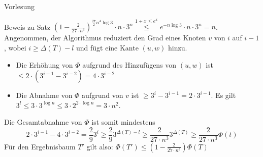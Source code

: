 \begin{section}{Vorlesung}
\begin{subsection}{Beweis zu Satz}
  $(1-\frac{2}{27 \cdot n^3})^{\frac{27}{2} n^4 \log 3} \cdot n \cdot 3^n \overset{1+x \leq e^x}{\leq} e^{-n\log 3}\cdot n \cdot 3^n = n$. \\
  Angenommen, der Algorithmus reduziert den Grad eines Knoten $v$ von $i$ auf $i-1$, wobei $i \geq \Delta(T)-l$ und fügt eine Kante $(u,w)$ hinzu.
  \begin{itemize}
   \item Die Erhöhung von $\Phi$ aufgrund des Hinzufügens von $(u,w)$ ist $\leq 2\cdot (3^{i-1}-3^{i-2}) = 4\cdot 3^{i-2}$
   \item Die Abnahme von $\Phi$ aufgrund von $v$ ist $\geq 3^i - 3^{i-1} = 2 \cdot 3^{i-1}$. Es gilt $3^l \leq 3 \cdot 3^{\log n} \leq 3 \cdot 2^{2\cdot \log n} = 3\cdot n^2$.
  \end{itemize}
  Die Gesamtabnahme von $\Phi$ ist somit mindestens
  \[2\cdot 3^{i-1} - 4\cdot 3^{i-2} = \frac{2}{9}3^i\geq \frac{2}{9}3^{\Delta(T)-l}\geq \frac{2}{27\cdot n^3}3^{\Delta(T)} \geq \frac{2}{27\cdot n^3} \Phi(t)\]
  Für den Ergebnisbaum $T'$ gilt also: $\Phi(T') \leq (1-\frac{2}{27\cdot n^3})\Phi(T)$

 \end{subsection}


\end{section}

